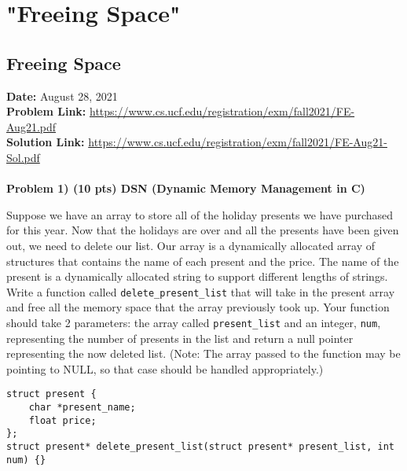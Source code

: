 \documentclass{article}
\begin{document}
\newpage

\section{"Freeing Space"}

\subsection{Freeing Space}

\textbf{Date:} August 28, 2021 \\

\textbf{Problem Link:} \url{https://www.cs.ucf.edu/registration/exm/fall2021/FE-Aug21.pdf} \\

\textbf{Solution Link:} \url{https://www.cs.ucf.edu/registration/exm/fall2021/FE-Aug21-Sol.pdf} \\
\\
\textbf{Problem 1) (10 pts) DSN (Dynamic Memory Management in C)}

Suppose we have an array to store all of the holiday presents we have purchased for this year. Now that the holidays are over and all the presents have been given out, we need to delete our list. Our array is a dynamically allocated array of structures that contains the name of each present and the price. The name of the present is a dynamically allocated string to support different lengths of strings. Write a function called \texttt{delete\_present\_list} that will take in the present array and free all the memory space that the array previously took up. Your function should take 2 parameters: the array called \texttt{present\_list} and an integer, \texttt{num}, representing the number of presents in the list and return a null pointer representing the now deleted list. (Note: The array passed to the function may be pointing to NULL, so that case should be handled appropriately.)

\begin{verbatim}
struct present {
    char *present_name;
    float price;
}; 
struct present* delete_present_list(struct present* present_list, int num) {}
\end{verbatim}
\end{document}
